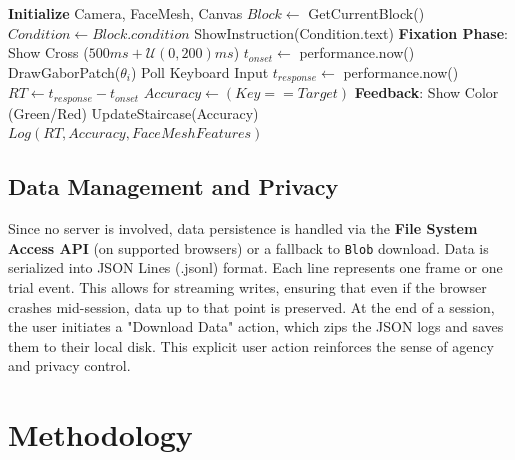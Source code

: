 \documentclass[dvipdfmx]{ehis}
\begin{document}
\begin{algorithm}
\caption{Camerala Task Loop (Simplified)}
\begin{algorithmic}
\STATE \textbf{Initialize} Camera, FaceMesh, Canvas
    \STATE $Block \leftarrow$ GetCurrentBlock()
    \STATE $Condition \leftarrow Block.condition$
    \STATE ShowInstruction(Condition.text)
        \STATE \textbf{Fixation Phase}: Show Cross ($500ms + \mathcal{U}(0, 200)ms$)
        \STATE $t_{onset} \leftarrow$ performance.now()
        \STATE DrawGaborPatch($\theta_i$)
            \STATE Poll Keyboard Input
        \ENDWHILE
        \STATE $t_{response} \leftarrow$ performance.now()
        \STATE $RT \leftarrow t_{response} - t_{onset}$
        \STATE $Accuracy \leftarrow (Key == Target)$
        \STATE \textbf{Feedback}: Show Color (Green/Red)
        \STATE UpdateStaircase(Accuracy)
        \STATE $Log(RT, Accuracy, FaceMeshFeatures)$
    \ENDFOR
\ENDWHILE
\end{algorithmic}
\end{algorithm}

\subsection{Data Management and Privacy}
Since no server is involved, data persistence is handled via the \textbf{File System Access API} (on supported browsers) or a fallback to \texttt{Blob} download.
Data is serialized into JSON Lines (.jsonl) format. Each line represents one frame or one trial event. This allows for streaming writes,
ensuring that even if the browser crashes mid-session, data up to that point is preserved.
At the end of a session, the user initiates a "Download Data" action, which zips the JSON logs and saves them to their local disk.
This explicit user action reinforces the sense of agency and privacy control.

\section{Methodology}
\end{document}
